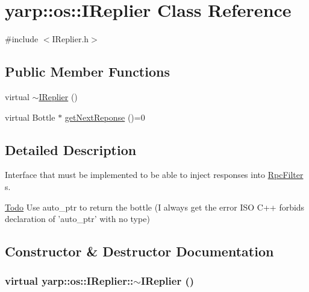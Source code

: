 \hypertarget{classyarp_1_1os_1_1_i_replier}{
\section{yarp::os::IReplier Class Reference}
\label{classyarp_1_1os_1_1_i_replier}
}


{\ttfamily \#include $<$IReplier.h$>$}\subsection*{Public Member Functions}
\begin{DoxyCompactItemize}
\item 
virtual \hyperlink{classyarp_1_1os_1_1_i_replier_a197fe86812f17bc97cc7bf1b94473e84}{$\sim$IReplier} ()
\item 
virtual Bottle $\ast$ \hyperlink{classyarp_1_1os_1_1_i_replier_a6b14c9b19625876caa5843b15537dcbd}{getNextReponse} ()=0
\end{DoxyCompactItemize}


\subsection{Detailed Description}
Interface that must be implemented to be able to inject responses into \hyperlink{classyarp_1_1os_1_1_rpc_filter}{RpcFilter} s.

\begin{Desc}
\item[\hyperlink{todo__todo000007}{Todo}]Use auto\_\-ptr to return the bottle (I always get the error ISO C++ forbids declaration of 'auto\_\-ptr' with no type) \end{Desc}


\subsection{Constructor \& Destructor Documentation}
\hypertarget{classyarp_1_1os_1_1_i_replier_a197fe86812f17bc97cc7bf1b94473e84}{
\subsubsection[{$\sim$IReplier}]{\setlength{\rightskip}{0pt plus 5cm}virtual yarp::os::IReplier::$\sim$IReplier ()}}
\label{classyarp_1_1os_1_1_i_replier_a197fe86812f17bc97cc7bf1b94473e84}


